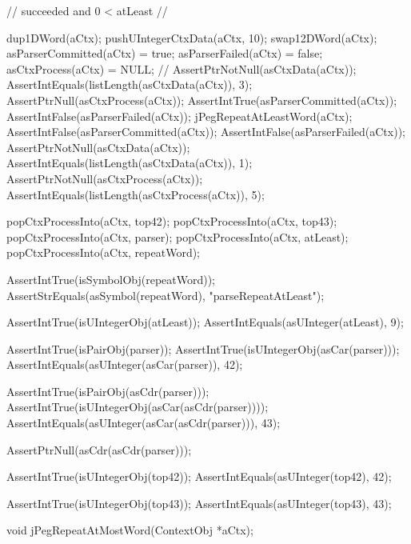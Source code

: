   // succeeded and 0 < atLeast
  //
  {
  dup1DWord(aCtx);
  pushUIntegerCtxData(aCtx, 10);
  swap12DWord(aCtx);
  asParserCommitted(aCtx) = true;
  asParserFailed(aCtx) = false;
  asCtxProcess(aCtx) = NULL;
  //
  AssertPtrNotNull(asCtxData(aCtx));
  AssertIntEquals(listLength(asCtxData(aCtx)), 3);
  AssertPtrNull(asCtxProcess(aCtx));
  AssertIntTrue(asParserCommitted(aCtx));
  AssertIntFalse(asParserFailed(aCtx));
  jPegRepeatAtLeastWord(aCtx);
  AssertIntFalse(asParserCommitted(aCtx));
  AssertIntFalse(asParserFailed(aCtx));
  AssertPtrNotNull(asCtxData(aCtx));
  AssertIntEquals(listLength(asCtxData(aCtx)), 1);
  AssertPtrNotNull(asCtxProcess(aCtx));
  AssertIntEquals(listLength(asCtxProcess(aCtx)), 5);
  
  popCtxProcessInto(aCtx, top42);
  popCtxProcessInto(aCtx, top43);
  popCtxProcessInto(aCtx, parser);
  popCtxProcessInto(aCtx, atLeast);
  popCtxProcessInto(aCtx, repeatWord);
  
  AssertIntTrue(isSymbolObj(repeatWord));
  AssertStrEquals(asSymbol(repeatWord), "parseRepeatAtLeast");
  
  AssertIntTrue(isUIntegerObj(atLeast));
  AssertIntEquals(asUInteger(atLeast), 9);
  
  AssertIntTrue(isPairObj(parser));
  AssertIntTrue(isUIntegerObj(asCar(parser)));
  AssertIntEquals(asUInteger(asCar(parser)), 42);
  
  AssertIntTrue(isPairObj(asCdr(parser)));
  AssertIntTrue(isUIntegerObj(asCar(asCdr(parser))));
  AssertIntEquals(asUInteger(asCar(asCdr(parser))), 43);
  
  AssertPtrNull(asCdr(asCdr(parser)));
  
  AssertIntTrue(isUIntegerObj(top42));
  AssertIntEquals(asUInteger(top42), 42);  

  AssertIntTrue(isUIntegerObj(top43));
  AssertIntEquals(asUInteger(top43), 43);  
  }
\stopCTest
\stopTestCase
\stopTestSuite

\startTestSuite[jPegRepeatAtMostWord]

\startCHeader
void jPegRepeatAtMostWord(ContextObj *aCtx);
\stopCHeader

